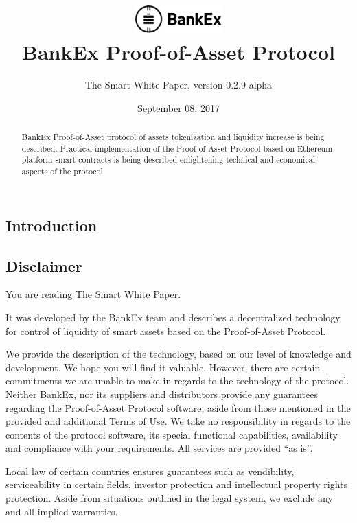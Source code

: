 \documentclass{article}
\title{\vspace{-3.85em}\includegraphics[width=0.25\textwidth]{logo.pdf} \\ \vspace{24pt} BankEx Proof-of-Asset Protocol}
\author{The Smart White Paper, version 0.2.9 alpha}
\date{September 08, 2017}
\begin{document}
\maketitle

\begin{abstract}
BankEx Proof-of-Asset protocol of assets tokenization and liquidity increase is being described. Practical implementation of the Proof-of-Asset Protocol based on Ethereum platform smart-contracts is being described enlightening technical and economical aspects of the protocol.
\end{abstract}

\vspace{24pt}

\begin{multicols}{2}

\tableofcontents

\section{Introduction}

\subsection{Disclaimer}

You are reading The Smart White Paper.

It was developed by the BankEx team and describes a decentralized technology for control of liquidity of smart assets based on the Proof-of-Asset Protocol.
	
We provide the description of the technology, based on our level of knowledge and development. We hope you will find it valuable. However, there are certain commitments we are unable to make in regards to the technology of the protocol.  
Neither BankEx, nor its suppliers and distributors provide any guarantees regarding the Proof-of-Asset Protocol software, aside from those mentioned in the provided and additional Terms of Use. We take no responsibility in regards to the contents of the protocol software, its special functional capabilities, availability and compliance with your requirements. All services are provided \enquote{as is}.

Local law of certain countries ensures guarantees such as vendibility, serviceability in certain fields, investor protection and intellectual property rights protection. Aside from situations outlined in the legal system, we exclude any and all implied warranties.


\end{multicols}
\end{document}
